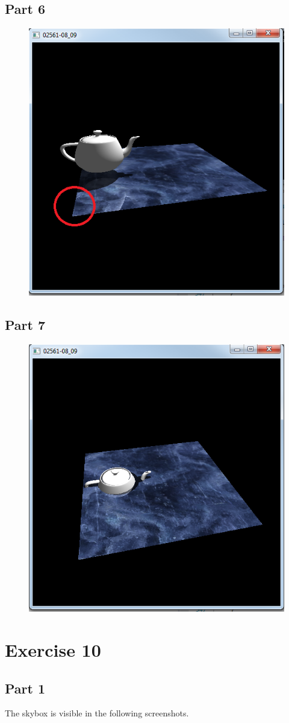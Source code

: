 \documentclass[11pt]{article}
\begin{document}
\subsection{Part 6}
\begin{figure}[H]
	\centering
	\includegraphics[width=0.5\linewidth]{images/e09p6}
	\label{fig:e09p6}
\end{figure}

\subsection{Part 7}
\begin{figure}[H]
	\centering
	\includegraphics[width=0.5\linewidth]{images/e09p7}
	\label{fig:e09p7}
\end{figure}


\section{Exercise 10}
\subsection{Part 1}
The skybox is visible in the following screenshots.
\end{document}
